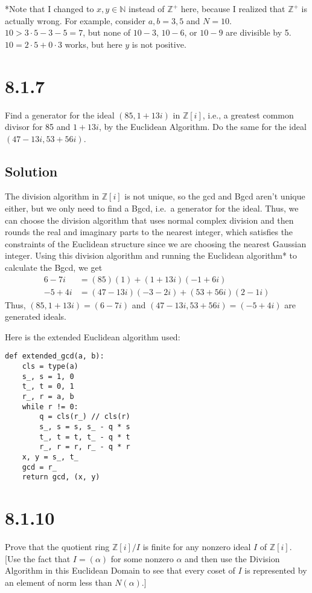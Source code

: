 \documentclass[fleqn]{article}
\begin{document}
        *Note that I changed to $x, y \in \mathbb{N}$ instead of $\mathbb{Z}^+$ here, because I realized that $\mathbb{Z}^+$ is actually wrong.  For example, consider $a, b = 3, 5$ and $N = 10$.  $10 > 3 \cdot 5 - 3 - 5 = 7$, but none of $10 - 3$, $10 - 6$, or $10 - 9$ are divisible by 5.  $10 = 2 \cdot 5 + 0 \cdot 3$ works, but here $y$ is not positive.
    
    \pagebreak
    
    \section{8.1.7}
    Find a generator for the ideal $(85, 1 + 13i)$ in $\mathbb{Z}[i]$, i.e., a greatest common divisor for 85 and $1 + 13i$, by the Euclidean Algorithm. 
    Do the same for the ideal $(47 - 13i, 53 + 56i)$.
        
        \subsection{Solution}
        The division algorithm in $\mathbb{Z}[i]$ is not unique, so the gcd and Bgcd aren't unique either, but we only need to find a Bgcd, i.e.\ a generator for the ideal.  Thus, we can choose the division algorithm that uses normal complex division and then rounds the real and imaginary parts to the nearest integer, which satisfies the constraints of the Euclidean structure since we are choosing the nearest Gaussian integer.  Using this division algorithm and running the Euclidean algorithm* to calculate the Bgcd, we get
        \begin{align}
            6 - 7i &= (85)(1) + (1 + 13i)(-1 + 6i) \\
            -5 + 4i &= (47 - 13i)(-3 - 2i) + (53 + 56i)(2 - 1i)
        \end{align}
        Thus, $(85, 1 + 13i) = (6 - 7i)$ and $(47 - 13i, 53 + 56i) = (-5 + 4i)$ are generated ideals.
        
        Here is the extended Euclidean algorithm used:
        \begin{verbatim}
def extended_gcd(a, b):
    cls = type(a)
    s_, s = 1, 0
    t_, t = 0, 1
    r_, r = a, b
    while r != 0:
        q = cls(r_) // cls(r)
        s_, s = s, s_ - q * s
        t_, t = t, t_ - q * t
        r_, r = r, r_ - q * r
    x, y = s_, t_
    gcd = r_
    return gcd, (x, y)
        \end{verbatim}
    
    \section{8.1.10}
    Prove that the quotient ring $\mathbb{Z}[i]/I$ is finite for any nonzero ideal $I$ of $\mathbb{Z}[i]$.  [Use the fact that $I = (\alpha)$ for some nonzero $\alpha$ and then use the Division Algorithm in this Euclidean Domain to see that every coset of $I$ is represented by an element of norm less than $N(\alpha)$.]
        
\end{document}
